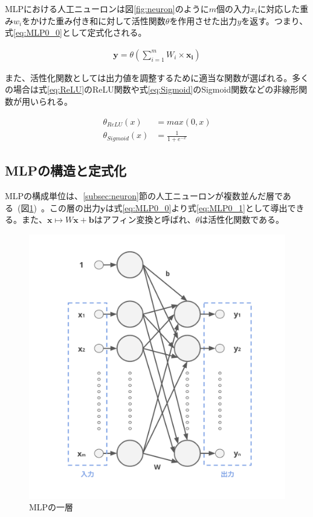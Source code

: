 MLPにおける人工ニューロンは図\ref{fig:neuron}のように$m$個の入力$x_i$に対応した重み$w_i$をかけた重み付き和に対して活性関数$\theta$を作用させた出力$y$を返す。つまり、式\ref{eq:MLP0_0}として定式化される。

\begin{align}
    \label{eq:MLP0_0}
    \boldsymbol{y}=\theta(\sum_{i=1}^{m} W_{i} \times \boldsymbol{x_i})
\end{align}

\clearpage

また、活性化関数としては出力値を調整するために適当な関数が選ばれる。多くの場合は式\ref{eq:ReLU}のReLU関数や式\ref{eq:Sigmoid}のSigmoid関数などの非線形関数が用いられる。

\begin{align}
    \label{eq:ReLU}
    \theta_{ReLU}(x)&=max(0,x)\\
    \label{eq:Sigmoid}
    \theta_{Sigmoid}(x)&=\frac{1}{1+e^{-x}}
\end{align}


\subsection{MLPの構造と定式化}

MLPの構成単位は、\ref{subsec:neuron}節の人工ニューロンが複数並んだ層である~(図\ref{fig:MLP_net0})~。この層の出力$\boldsymbol{y}$は式\ref{eq:MLP0_0}より式\ref{eq:MLP0_1}として導出できる。また、$\boldsymbol{x} \mapsto W\boldsymbol{x}+\boldsymbol{b}$はアフィン変換と呼ばれ、$\theta$は活性化関数である。

\begin{figure}[b]
\begin{center}
\includegraphics[width=0.6\hsize]{figure/mlp_net0.png}
\caption{MLPの一層}
\label{fig:MLP_net0}
\end{center}
\end{figure}

